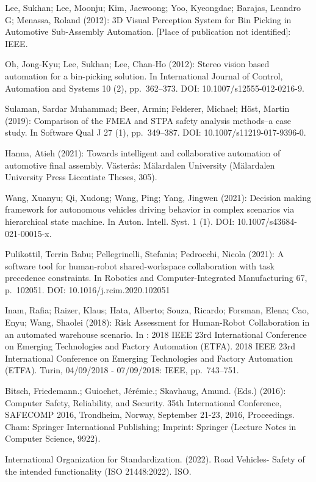 \begin{thebibliography}{99}
 Lee, Sukhan; Lee, Moonju; Kim, Jaewoong; Yoo, Kyeongdae; Barajas, Leandro G; Menassa, Roland (2012): 3D Visual Perception System for Bin Picking in Automotive Sub-Assembly Automation. [Place of publication not identified]: IEEE.

 Oh, Jong-Kyu; Lee, Sukhan; Lee, Chan-Ho (2012): Stereo vision based automation for a bin-picking solution. In International Journal of Control, Automation and Systems 10 (2), pp. 362–373. DOI: 10.1007/s12555-012-0216-9.

 Sulaman, Sardar Muhammad; Beer, Armin; Felderer, Michael; Höst, Martin (2019): Comparison of the FMEA and STPA safety analysis methods–a case study. In Software Qual J 27 (1), pp. 349–387. DOI: 10.1007/s11219-017-9396-0.

 Hanna, Atieh (2021): Towards intelligent and collaborative automation of automotive final assembly. Västerås: Mälardalen University (Mälardalen University Press Licentiate Theses, 305).

 Wang, Xuanyu; Qi, Xudong; Wang, Ping; Yang, Jingwen (2021): Decision making framework for autonomous vehicles driving behavior in complex scenarios via hierarchical state machine. In Auton. Intell. Syst. 1 (1). DOI: 10.1007/s43684-021-00015-x.

 Pulikottil, Terrin Babu; Pellegrinelli, Stefania; Pedrocchi, Nicola (2021): A software tool for human-robot shared-workspace collaboration with task precedence constraints. In Robotics and Computer-Integrated Manufacturing 67, p. 102051. DOI: 10.1016/j.rcim.2020.102051

 Inam, Rafia; Raizer, Klaus; Hata, Alberto; Souza, Ricardo; Forsman, Elena; Cao, Enyu; Wang, Shaolei (2018): Risk Assessment for Human-Robot Collaboration in an automated warehouse scenario. In : 2018 IEEE 23rd International Conference on Emerging Technologies and Factory Automation (ETFA). 2018 IEEE 23rd International Conference on Emerging Technologies and Factory Automation (ETFA). Turin, 04/09/2018 - 07/09/2018: IEEE, pp. 743–751.

 Bitsch, Friedemann.; Guiochet, Jérémie.; Skavhaug, Amund. (Eds.) (2016): Computer Safety, Reliability, and Security. 35th International Conference, SAFECOMP 2016, Trondheim, Norway, September 21-23, 2016, Proceedings. Cham: Springer International Publishing; Imprint: Springer (Lecture Notes in Computer Science, 9922).

International Organization for Standardization. (2022). Road Vehicles- Safety of the intended functionality  (ISO 21448:2022). ISO.

\end{thebibliography}

\printbibliography
